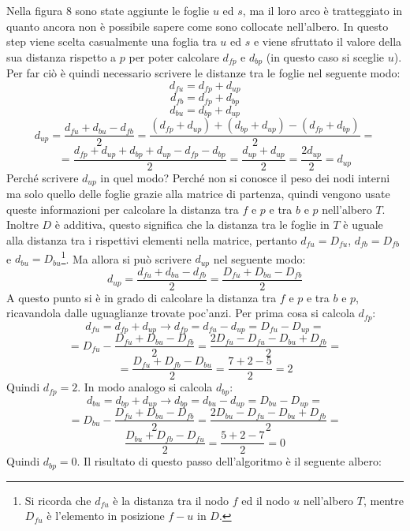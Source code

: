 \newline
Nella figura 8 sono state aggiunte le foglie $u$ ed $s$, ma il loro arco è tratteggiato in quanto ancora non è possibile sapere come sono collocate nell'albero.
\newline
In questo step viene scelta casualmente una foglia tra $u$ ed $s$ e viene sfruttato il valore della sua distanza rispetto a $p$ per poter calcolare $d_{fp}$ e $d_{bp}$ (in questo caso si sceglie $u$). Per far ciò è quindi necessario scrivere le distanze tra le foglie nel seguente modo:
\[d_{fu}=d_{fp}+d_{up}\]
\[d_{fb}=d_{fp}+d_{bp}\]
\[d_{bu}=d_{bp}+d_{up}\]
\[d_{up}=\frac{d_{fu}+d_{bu}-d_{fb}}2=
\frac{(d_{fp}+d_{up})+(d_{bp}+d_{up})-(d_{fp}+d_{bp})}2=\]
\[=\frac{d_{fp}+d_{up}+d_{bp}+d_{up}-d_{fp}-d_{bp}}2=
\frac{d_{up}+d_{up}}2=
\frac{2d_{up}}2=d_{up}
\]
Perché scrivere $d_{up}$ in quel modo? Perché non si conosce il peso dei nodi interni ma solo quello delle foglie grazie alla matrice di partenza, quindi vengono usate queste informazioni per calcolare la distanza tra $f$ e $p$ e tra $b$ e $p$ nell'albero $T$. Inoltre $D$ è additiva, questo significa che la distanza tra le foglie in $T$ è uguale alla distanza tra i rispettivi elementi nella matrice, pertanto $d_{fu}=D_{fu}$, $d_{fb}=D_{fb}$ e $d_{bu}=D_{bu}$\footnote{Si ricorda che $d_{fu}$ è la distanza tra il nodo $f$ ed il nodo $u$ nell'albero $T$, mentre $D_{fu}$ è l'elemento in posizione $f-u$ in $D$.}. Ma allora si può scrivere $d_{up}$ nel seguente modo:
\[d_{up}=\frac{d_{fu}+d_{bu}-d_{fb}}2=\frac{D_{fu}+D_{bu}-D_{fb}}2\]
A questo punto si è in grado di calcolare la distanza tra $f$ e $p$ e tra $b$ e $p$, ricavandola dalle uguaglianze trovate poc'anzi. Per prima cosa si calcola $d_{fp}$:
\[d_{fu}=d_{fp}+d_{up} \rightarrow d_{fp}=d_{fu}-d_{up}=D_{fu}-D_{up}=\]
\[=D_{fu}-\frac{D_{fu}+D_{bu}-D_{fb}}2=\frac{2D_{fu}-D_{fu}-D_{bu}+D_{fb}}2=\]
\[=\frac{D_{fu}+D_{fb}-D_{bu}}2=\frac{7+2-5}2=2\]
Quindi $d_{fp}=2$. In modo analogo si calcola $d_{bp}$:
\[d_{bu}=d_{bp}+d_{up} \rightarrow d_{bp}=d_{bu}-d_{up}=D_{bu}-D_{up}=\]
\[=D_{bu}-\frac{D_{fu}+D_{bu}-D_{fb}}2=\frac{2D_{bu}-D_{fu}-D_{bu}+D_{fb}}2=\]
\[\frac{D_{bu}+D_{fb}-D_{fu}}2=\frac{5+2-7}2=0\]
Quindi $d_{bp}=0$. Il risultato di questo passo dell'algoritmo è il seguente albero:
